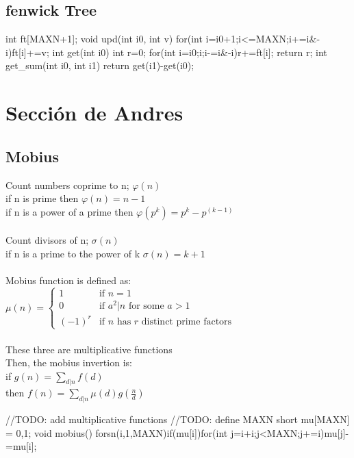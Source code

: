 \documentclass[10pt, landscape, twocolumn, a4paper, notitlepage]{article}
\newcommand{\threepartdef}[6]
{
	\left\{
		\begin{array}{lll}
			#1 & \mbox{if } #2 \\
			#3 & \mbox{if } #4 \\
			#5 & \mbox{if } #6
		\end{array}
	\right.
}
\begin{document}
\subsection{fenwick Tree}
\begin{code}
int ft[MAXN+1]; 
void upd(int i0, int v){
	for(int i=i0+1;i<=MAXN;i+=i&-i)ft[i]+=v;
}
int get(int i0){
	int r=0;
	for(int i=i0;i;i-=i&-i)r+=ft[i];
	return r;
}
int get_sum(int i0, int i1){ return get(i1)-get(i0);}
\end{code}
\section{Secci\'on de Andres}
\subsection{Mobius}
Count numbers coprime to n; $\varphi(n)$\\
if n is prime then $\varphi(n) = n - 1$\\
if n is a power of a prime then $\varphi(p^k) = p^k - p^(k-1)$\\
\\
Count divisors of n; $\sigma(n)$\\
if n is a prime to the power of k $\sigma(n) = k + 1$\\
\\
Mobius function is defined as: \\
$\mu(n) = \threepartdef
{1}      {n=1}
{0}      {a^2 | n \mbox{ for some } a > 1}
{(-1)^r} {n \mbox{ has } r \mbox{ distinct prime factors}}$\\
\\
These three are multiplicative functions\\
Then, the mobius invertion is:\\
if $g(n) = \sum_{d|n} f(d)$ \\
then $f(n) = \sum_{d|n} \mu(d)g(\frac{n}{d})$

\begin{code}
//TODO: add multiplicative functions
//TODO: define MAXN
short mu[MAXN] = {0,1};
void mobius(){
	forsn(i,1,MAXN)if(mu[i])for(int j=i+i;j<MAXN;j+=i)mu[j]-=mu[i];
}
\end{code}
\end{document}

